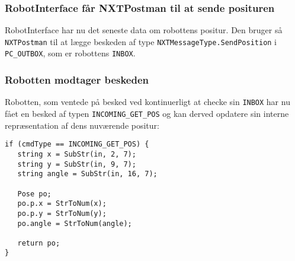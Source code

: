 \subsubsection{RobotInterface får NXTPostman til at sende posituren}
RobotInterface har nu det seneste data om robottens positur.
Den bruger så \lstinline[style=csharp]!NXTPostman! til at lægge beskeden af type \lstinline[style=csharp]!NXTMessageType.SendPosition! i \lstinline[style=csharp]!PC_OUTBOX!, som er robottens \lstinline[style=c]!INBOX!.

\subsubsection{Robotten modtager beskeden}
Robotten, som ventede på besked ved kontinuerligt at checke sin \lstinline[style=c]!INBOX! har nu fået en besked af typen \lstinline[style=c]!INCOMING_GET_POS! og kan derved opdatere sin interne repræsentation af dens nuværende positur:

\begin{lstlisting}[style=csmall,label=lst:updatepose,caption=Robotten opdaterer sin positur ud fra den modtaget fra PC]
if (cmdType == INCOMING_GET_POS) {
   string x = SubStr(in, 2, 7);
   string y = SubStr(in, 9, 7);
   string angle = SubStr(in, 16, 7);

   Pose po;
   po.p.x = StrToNum(x);
   po.p.y = StrToNum(y);
   po.angle = StrToNum(angle);

   return po;
}
\end{lstlisting}
